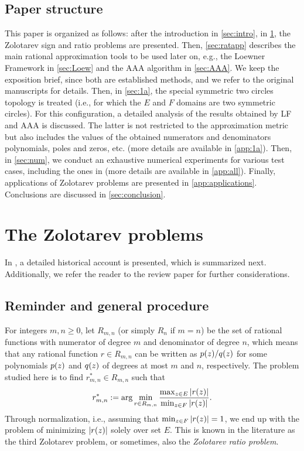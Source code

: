 \subsection{Paper structure}
This paper is organized as follows: after the introduction in \cref{sec:intro}, in \cref{sec:zolo}, the Zolotarev sign and ratio problems are presented. Then, \cref{sec:ratapp} describes the main rational approximation tools to be used later on, e.g., the Loewner Framework in \cref{sec:Loew} and the AAA algorithm in \cref{sec:AAA}. We keep the exposition brief, since both are established methods, and we refer to the original manuscripts for details. Then, in \cref{sec:1a}, the special symmetric two circles topology is treated (i.e., for which the $E$ and $F$ domains are two symmetric circles). For this configuration, a detailed analysis of the results obtained by LF and AAA is discussed. The latter is not restricted to the approximation metric but also includes the values of the obtained numerators and denominators polynomials, poles and zeros, etc. (more details are available in \cref{app:1a}). Then,  in \cref{sec:num}, we conduct an exhaustive numerical experiments for various test cases, including the ones in \cite{trefethen2024computation} (more details are available in \cref{app:all}). Finally, applications of Zolotarev problems are presented in  \cref{app:applications}. Conclusions are discussed in \cref{sec:conclusion}.

\section{The Zolotarev problems}\label{sec:zolo}

In \cite{trefethen2024computation}, a detailed historical account is presented, which is summarized next. Additionally, we refer the reader to the review paper \cite{nakatsukasa2016computing} for further considerations.

\subsection{Reminder and general procedure}

For integers $m,n\ge 0$, let $R_{m,n}$ (or simply $R_n$ if $m=n$) be the set of rational functions with numerator of degree $m$ and denominator of degree $n$, which means that any rational function $r\in R_{m,n}$ can be written as $p(z)/q(z)$ for some polynomials $p(z)$ and $q(z)$ of degrees at most $m$ and $n$, respectively. The problem  studied here is to find $r_{m,n}^*\in R_{m,n}$ such that
\begin{equation}
r_{m,n}^* := \arg \min_{r\in R_{m,n}} {\max_{z\in E} |r(z)| \over \min_{z\in F} |r(z)|}.
\label{eq:unscaled}
\end{equation}
Through normalization, i.e., assuming that $\min_{z\in F} |r(z)| = 1$, we end up with the problem of minimizing $|r(z)|$ solely over set $E$. This is known in the literature as the third Zolotarev problem, or sometimes, also the {\em Zolotarev ratio problem}.

